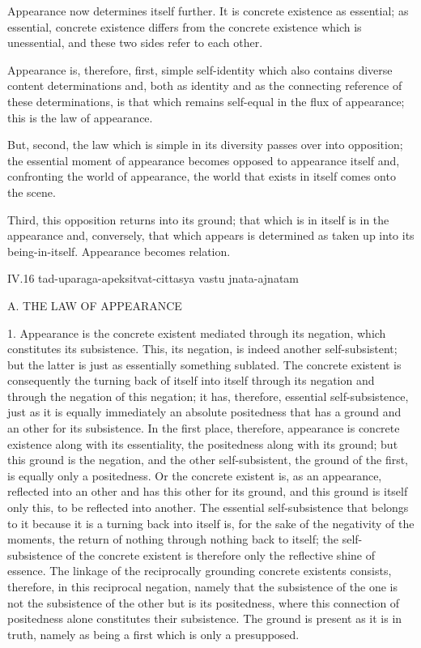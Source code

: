 Appearance now determines itself further.
It is concrete existence as essential;
as essential, concrete existence
differs from the concrete existence
which is unessential,
and these two sides
refer to each other.

Appearance is, therefore,
first, simple self-identity
which also contains
diverse content determinations
and, both as identity
and as the connecting reference
of these determinations,
is that which remains self-equal
in the flux of appearance;
this is the law of appearance.

But, second, the law which is
simple in its diversity
passes over into opposition;
the essential moment of appearance becomes
opposed to appearance itself
and, confronting the world of appearance,
the world that exists in itself
comes onto the scene.

Third, this opposition returns into its ground;
that which is in itself is in the appearance
and, conversely, that which appears is determined
as taken up into its being-in-itself.
Appearance becomes relation.

IV.16
tad-uparaga-apeksitvat-cittasya vastu jnata-ajnatam

A. THE LAW OF APPEARANCE

1. Appearance is the concrete existent
mediated through its negation,
which constitutes its subsistence.
This, its negation, is
indeed another self-subsistent;
but the latter is just as
essentially something sublated.
The concrete existent is consequently
the turning back of itself into itself
through its negation and through
the negation of this negation;
it has, therefore, essential self-subsistence,
just as it is equally immediately an absolute positedness
that has a ground and an other for its subsistence.
In the first place, therefore, appearance is
concrete existence along with its essentiality,
the positedness along with its ground;
but this ground is the negation,
and the other self-subsistent,
the ground of the first,
is equally only a positedness.
Or the concrete existent is,
as an appearance,
reflected into an other
and has this other for its ground,
and this ground is itself only this,
to be reflected into another.
The essential self-subsistence
that belongs to it because
it is a turning back into itself is,
for the sake of the negativity of the moments,
the return of nothing through nothing back to itself;
the self-subsistence of the concrete existent is
therefore only the reflective shine of essence.
The linkage of the reciprocally grounding
concrete existents consists, therefore,
in this reciprocal negation,
namely that the subsistence of the one is not
the subsistence of the other but is its positedness,
where this connection of positedness
alone constitutes their subsistence.
The ground is present as it is in truth,
namely as being a first which is only a presupposed.

